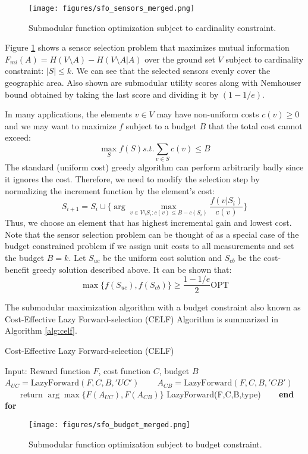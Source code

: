 \begin{figure}[tbhp]
    \centering
    \texttt{[image: figures/sfo\_sensors\_merged.png]}
    \caption{Submodular function optimization subject to cardinality constraint.}
    \label{fig:sensors_merged}
\end{figure}

Figure \ref{fig:sensors_merged} shows a sensor selection problem that maximizes mutual information $F_{mi}(A) = H(V\setminus A) - H(V\setminus A | A)$ over the ground set $V$ subject to cardinality constraint: $|S| \leq k$. We can see that the selected sensors evenly cover the geographic area. Also shown are submodular utility scores along with Nemhouser bound obtained by taking the last score and dividing it by $(1-1/e)$.    

In many applications, the elements $v \in V$ may have non-uniform costs $c(v)\geq 0$ and we may want to maximize $f$ subject to a budget $B$ that the total cost cannot exceed:
\begin{equation}
    \max_S f(S) s.t. \sum_{v \in S} c(v) \leq B
\end{equation}
The standard (uniform cost) greedy algorithm can perform arbitrarily badly since it ignores the cost. Therefore, we need to modify the selection step by normalizing the increment function by the element's cost:
\begin{equation}
    S_{i+1} = S_i \cup \bigg\{ \arg \max_{v \in V\setminus S_i : c(v)\leq B-c(S_i)} \frac{f(v|S_i)}{c(v)} \bigg\}
\end{equation}
Thus, we choose an element that has highest incremental gain and lowest cost. Note that the sensor selection problem can be thought of as a special case of the budget constrained problem if we assign unit costs to all measurements and set the budget $B=k$. Let $S_{uc}$ be the uniform cost solution and $S_{cb}$ be the cost-benefit greedy solution described above. It can be shown that:
\begin{equation}
    \max\{f(S_{uc}),f(S_{cb})\} \geq \frac{1-1/e}{2}\mathrm{OPT} 
\end{equation}

The submodular maximization algorithm with a budget constraint also known as Cost-Effective Lazy Forward-selection (CELF) Algorithm is summarized in Algorithm \ref{alg:celf}.

\begin{algorithm}
\caption{Cost-Effective Lazy Forward-selection (CELF)}
\label{alg:celf}
\begin{algorithmic}[1]
\STATE Input: Reward function $F$, cost function $C$, budget $B$
\STATE ~~~ $A_{UC} = \mathrm{LazyForward}(F,C,B,'UC')$
\STATE ~~~ $A_{CB} = \mathrm{LazyForward}(F,C,B,'CB')$
\STATE ~~~ return $\arg \max \{F(A_{UC}),F(A_{CB})\}$
\STATE LazyForward(F,C,B,type)
\STATE ~~~ 
\STATE \textbf{end for}  
\end{algorithmic}
\end{algorithm}



\begin{figure}[tbhp]
    \centering
    \texttt{[image: figures/sfo\_budget\_merged.png]}
    \caption{Submodular function optimization subject to budget constraint.}
    \label{fig:sensors_budget}
\end{figure}







